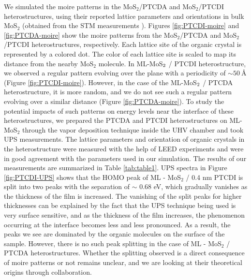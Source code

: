 \documentclass[12pt]{article}
\begin{document}
We simulated the moire patterns in the MoS$_2$/PTCDA and MoS$_2$/PTCDI heterostructures, using their reported lattice parameters and orientations in bulk MoS$_2$ (obtained from the STM measurements \cite{ludwig1994stm}). Figures \ref{fig:PTCDI-moire} and \ref{fig:PTCDA-moire} show the moire patterns from the MoS$_2$/PTCDA and MoS$_2$/PTCDI heterostructures, respectively. Each lattice site of the organic crystal is represented by a colored dot. The color of each lattice site is scaled to map its distance from the nearby MoS$_2$ molecule. In ML-MoS$\protect_2$ / PTCDI heterostructure, we observed a regular pattern evolving over the plane with a periodicity of $\sim \SI{50}{\angstrom}$ (Figure \ref{fig:PTCDI-moire}). However, in the case of the ML-MoS$\protect_2$ / PTCDA heterostructure, it is more random, and we do not see such a regular pattern evolving over a similar distance (Figure \ref{fig:PTCDA-moire}). To study the potential impacts of such patterns on energy levels near the interface of these heterostructures, we prepared the PTCDA and PTCDI heterostructures on ML-MoS$_2$ through the vapor deposition technique inside the UHV chamber and took UPS measurements. The lattice parameters and orientation of organic crystals in the heterostructure were measured with the help of LEED experiments and were in good agreement with the parameters used in our simulation. The results of our measurements are summarized in Table \ref{tab:table1}. UPS spectra in Figure \ref{fig:PTCDI-UPS} shows that the HOMO peak of ML - MoS$_2$ / 0.4 nm PTCDI is split into two peaks with the separation of $\sim$ 0.68 eV, which gradually vanishes as the thickness of the film is increased. The vanishing of the split peaks for higher thicknesses can be explained by the fact that the UPS technique being used is very surface sensitive, and as the thickness of the film increases, the phenomenon occurring at the interface becomes less and less pronounced. As a result, the peaks we see are dominated by the organic molecules on the surface of the sample. However, there is no such peak splitting in the case of ML - MoS$_2$ / PTCDA heterostructures. Whether the splitting observed is a direct consequence of moire patterns or not remains unclear, and we are looking at their theoretical origins through collaboration.
\end{document}
